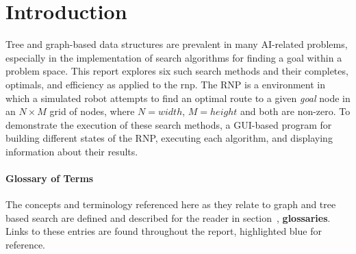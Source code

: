 \section{Introduction} %
\label{sec:introduction}
Tree and graph-based data structures are prevalent in many AI-related problems, especially in the implementation of search algorithms for finding a goal within a problem space. This report explores six such search methods and their \glspl{complete}, \glspl{optimal}, and efficiency as applied to the \acrlong{rnp}. The RNP is a \Gls{environment} in which a simulated robot attempts to find an optimal route to a given \textit{goal} \gls{node} in an $N \times M$ grid of nodes, where $N=width$, $M=height$ and both are non-zero. To demonstrate the execution of these search methods, a GUI-based program for building different states of the RNP, executing each algorithm, and displaying information about their results.

\paragraph{Glossary of Terms} %
\label{par:glossary_of_terms}
The concepts and terminology referenced here as they relate to graph and tree based search are defined and described for the reader in section~\pageref{glossaries}, \textbf{glossaries}. Links to these entries are found throughout the report, highlighted blue for reference.
